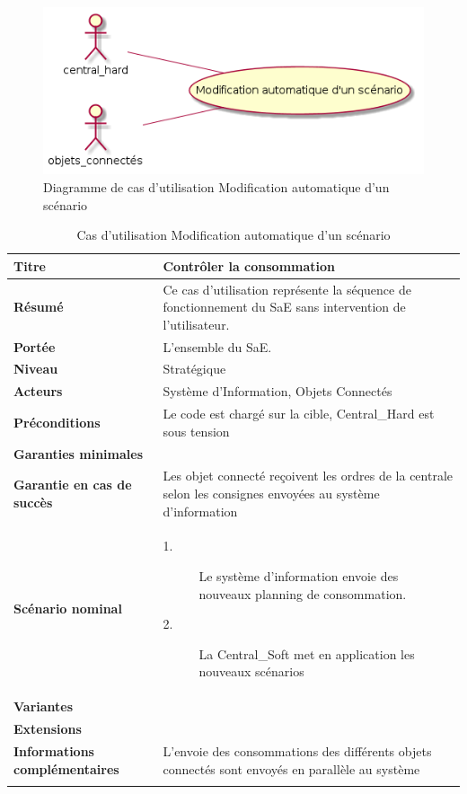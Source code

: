 \documentclass[10pt,a4paper]{report}
\renewcommand{\arraystretch}{1.2}
\begin{document}
\begin{figure}[H]
	\centering
	\includegraphics[scale=0.55]{diagCU_ModifAutoScenar}
	\caption{Diagramme de cas d'utilisation Modification automatique d'un scénario}
	\label{diagCuModifAutoScenar}
\end{figure}

{
\renewcommand{\arraystretch}{1.2}
\begin{longtable}{| p{5cm} | p{11cm} |}
	\hline
	\cellcolor{lightgray}\textbf{\textbf{Titre}} & \cellcolor{lightgray}\textbf{Contrôler la consommation}\tabularnewline
	\hline
	\textbf{Résumé} & Ce cas d'utilisation représente la séquence de fonctionnement du SaE sans intervention de l'utilisateur.\tabularnewline
	\hline
	\textbf{Portée} & L'ensemble du SaE.\tabularnewline
	\hline
	\textbf{Niveau} & Stratégique\tabularnewline
	\hline
	\textbf{Acteurs} & Système d'Information, Objets Connectés\tabularnewline
	\hline
	\textbf{Préconditions } & Le code est chargé sur la cible, Central\_Hard est sous tension\tabularnewline
	\hline
	\textbf{Garanties minimales} & \tabularnewline
	\hline
	\textbf{Garantie en cas de succès} & Les objet connecté reçoivent les ordres de la centrale selon les consignes envoyées au système d'information\tabularnewline
	\hline
	\textbf{Scénario nominal} & \begin{description}
		\item[1.] Le système d'information envoie des nouveaux planning de consommation.
		\item[2.] La Central\_Soft met en application les nouveaux scénarios
	\end{description}\tabularnewline
	\hline 
	\textbf{Variantes} & \tabularnewline
	\hline
	\textbf{Extensions} & \tabularnewline
	\hline
	\textbf{Informations complémentaires} & L'envoie des consommations des différents objets connectés sont envoyés en parallèle au système\tabularnewline
	\hline
\caption{Cas d'utilisation Modification automatique d'un scénario}	
\label{tableUC_ModifAutoScenar}
\end{longtable}
}
\end{document}
